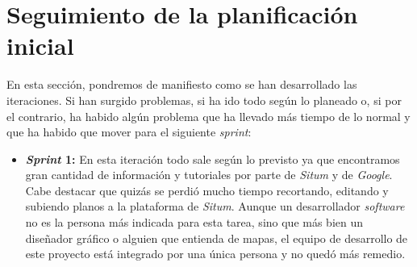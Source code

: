 \section{Seguimiento de la planificación inicial}
En esta sección, pondremos de manifiesto como se han desarrollado las iteraciones. Si han surgido problemas, si ha ido todo según lo planeado o, si por el contrario, ha habido algún problema que ha llevado más tiempo de lo normal y que ha habido que mover para el siguiente \textit{sprint}:
\begin{itemize}
\item \textbf{\textit{Sprint} 1:} En esta iteración todo sale según lo previsto ya que encontramos gran cantidad de información y tutoriales por parte de \textit{Situm} y de \textit{Google}. Cabe destacar que quizás se perdió mucho tiempo recortando, editando y subiendo planos a la plataforma de \textit{Situm}. Aunque un desarrollador \textit{software} no es la persona más indicada para esta tarea, sino que más bien un diseñador gráfico o alguien que entienda de mapas, el equipo de desarrollo de este proyecto está integrado por una única persona y no quedó más remedio. 


\end{itemize}
